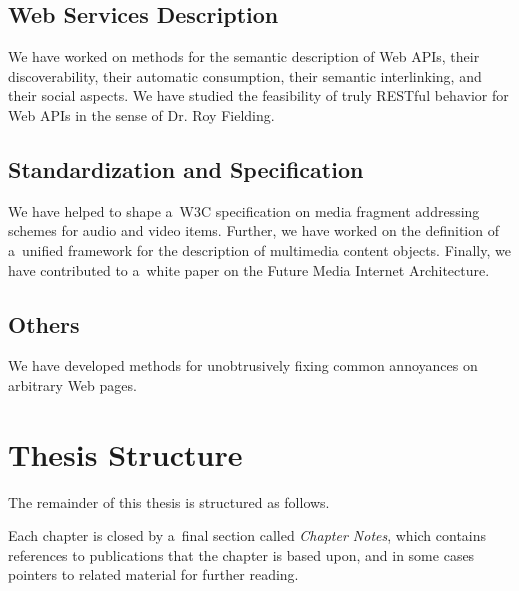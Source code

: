 \subsection{Web Services Description}

We have worked on methods for the semantic description of Web APIs,
their discoverability, their automatic consumption,
their semantic interlinking, and their social aspects.
We have studied the feasibility of truly RESTful behavior
for Web APIs in the sense of Dr. Roy Fielding.
        
\subsection{Standardization and Specification}        
We have helped to shape a~W3C specification on media
fragment addressing schemes for audio and video items.
Further, we have worked on the definition of a~unified framework
for the description of multimedia content objects.
Finally, we have contributed to a~white paper on the
Future Media Internet Architecture.

\subsection{Others}

We have developed methods for unobtrusively fixing
common annoyances on arbitrary Web pages.

\section{Thesis Structure}

The remainder of this thesis is structured as follows. 

Each chapter is closed by a~final section called
\emph{Chapter Notes}, which contains references to publications
that the chapter is based upon,
and in some cases pointers to related material for further reading.